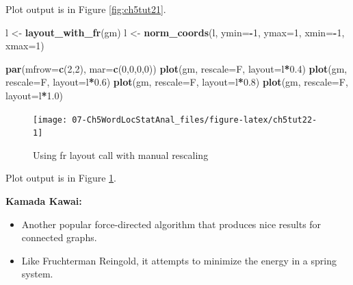 \documentclass[
]{article}
\newenvironment{Shaded}{\begin{snugshade}}{\end{snugshade}}
\newcommand{\AttributeTok}[1]{\textcolor[rgb]{0.13,0.29,0.53}{#1}}
\newcommand{\DecValTok}[1]{\textcolor[rgb]{0.00,0.00,0.81}{#1}}
\newcommand{\FloatTok}[1]{\textcolor[rgb]{0.00,0.00,0.81}{#1}}
\newcommand{\FunctionTok}[1]{\textcolor[rgb]{0.13,0.29,0.53}{\textbf{#1}}}
\newcommand{\NormalTok}[1]{#1}
\newcommand{\OtherTok}[1]{\textcolor[rgb]{0.56,0.35,0.01}{#1}}
\newcommand{\SpecialCharTok}[1]{\textcolor[rgb]{0.81,0.36,0.00}{\textbf{#1}}}
\providecommand{\tightlist}{%
  \setlength{\itemsep}{0pt}\setlength{\parskip}{0pt}}
\begin{document}
Plot output is in Figure \ref{fig:ch5tut21}.

\begin{Shaded}
\begin{Highlighting}[]
\NormalTok{l }\OtherTok{\textless{}{-}} \FunctionTok{layout\_with\_fr}\NormalTok{(gm)}
\NormalTok{l }\OtherTok{\textless{}{-}} \FunctionTok{norm\_coords}\NormalTok{(l, }\AttributeTok{ymin=}\SpecialCharTok{{-}}\DecValTok{1}\NormalTok{, }\AttributeTok{ymax=}\DecValTok{1}\NormalTok{, }\AttributeTok{xmin=}\SpecialCharTok{{-}}\DecValTok{1}\NormalTok{, }\AttributeTok{xmax=}\DecValTok{1}\NormalTok{)}

\FunctionTok{par}\NormalTok{(}\AttributeTok{mfrow=}\FunctionTok{c}\NormalTok{(}\DecValTok{2}\NormalTok{,}\DecValTok{2}\NormalTok{), }\AttributeTok{mar=}\FunctionTok{c}\NormalTok{(}\DecValTok{0}\NormalTok{,}\DecValTok{0}\NormalTok{,}\DecValTok{0}\NormalTok{,}\DecValTok{0}\NormalTok{))}
\FunctionTok{plot}\NormalTok{(gm, }\AttributeTok{rescale=}\NormalTok{F, }\AttributeTok{layout=}\NormalTok{l}\SpecialCharTok{*}\FloatTok{0.4}\NormalTok{)}
\FunctionTok{plot}\NormalTok{(gm, }\AttributeTok{rescale=}\NormalTok{F, }\AttributeTok{layout=}\NormalTok{l}\SpecialCharTok{*}\FloatTok{0.6}\NormalTok{)}
\FunctionTok{plot}\NormalTok{(gm, }\AttributeTok{rescale=}\NormalTok{F, }\AttributeTok{layout=}\NormalTok{l}\SpecialCharTok{*}\FloatTok{0.8}\NormalTok{)}
\FunctionTok{plot}\NormalTok{(gm, }\AttributeTok{rescale=}\NormalTok{F, }\AttributeTok{layout=}\NormalTok{l}\SpecialCharTok{*}\FloatTok{1.0}\NormalTok{)}
\end{Highlighting}
\end{Shaded}

\begin{figure}

{\centering \texttt{[image: 07-Ch5WordLocStatAnal\_files/figure-latex/ch5tut22-1]} 

}

\caption{Using fr layout call with manual rescaling}\label{fig:ch5tut22}
\end{figure}

Plot output is in Figure \ref{fig:ch5tut22}.

\textbf{Kamada Kawai:}

\begin{itemize}
\tightlist
\item
  Another popular force-directed algorithm that produces nice results for connected graphs.
\item
  Like Fruchterman Reingold, it attempts to minimize the energy in a spring system.
\end{itemize}
\end{document}
